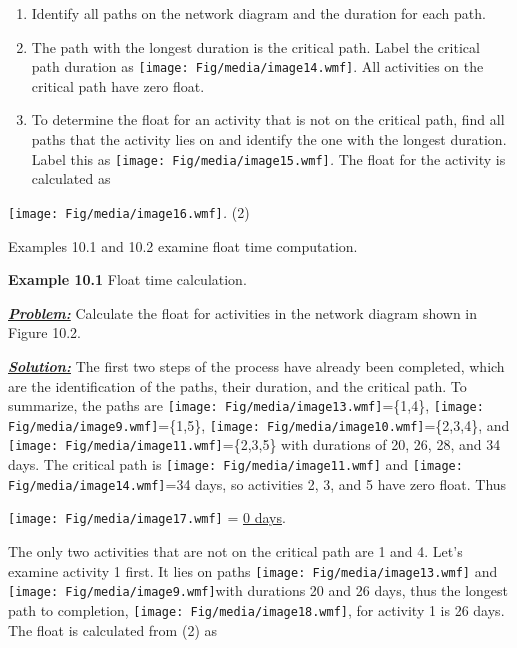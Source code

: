 \begin{enumerate}
\def\labelenumi{\arabic{enumi}.}
\item
  Identify all paths on the network diagram and the duration for each
  path.
\item
  The path with the longest duration is the critical path. Label the
  critical path duration as
  \texttt{[image: Fig/media/image14.wmf]}.
  All activities on the critical path have zero float.
\item
  To determine the float for an activity that is not on the critical
  path, find all paths that the activity lies on and identify the one
  with the longest duration. Label this as
  \texttt{[image: Fig/media/image15.wmf]}\emph{.} The float for the
  activity is calculated as
\end{enumerate}

\texttt{[image: Fig/media/image16.wmf]}\emph{.}
(2)

Examples 10.1 and 10.2 examine float time computation.

\textbf{Example 10.1} Float time calculation.

\emph{\textbf{\ul{Problem:}}} Calculate the float for activities in the
network diagram shown in Figure 10.2.

\emph{\textbf{\ul{Solution:}}} The first two steps of the process have
already been completed, which are the identification of the paths, their
duration, and the critical path. To summarize, the paths are
\texttt{[image: Fig/media/image13.wmf]}=\{1,4\},
\texttt{[image: Fig/media/image9.wmf]}=\{1,5\},
\texttt{[image: Fig/media/image10.wmf]}=\{2,3,4\},
and
\texttt{[image: Fig/media/image11.wmf]}=\{2,3,5\}
with durations of 20, 26, 28, and 34 days. The critical path is
\texttt{[image: Fig/media/image11.wmf]}
and
\texttt{[image: Fig/media/image14.wmf]}=34
days, so activities 2, 3, and 5 have zero float. Thus

\texttt{[image: Fig/media/image17.wmf]}
= \ul{0 days}.

The only two activities that are not on the critical path are 1 and 4.
Let's examine activity 1 first. It lies on paths
\texttt{[image: Fig/media/image13.wmf]}
and
\texttt{[image: Fig/media/image9.wmf]}with
durations 20 and 26 days, thus the longest path to completion,
\texttt{[image: Fig/media/image18.wmf]},
for activity 1 is 26 days. The float is calculated from (2) as

